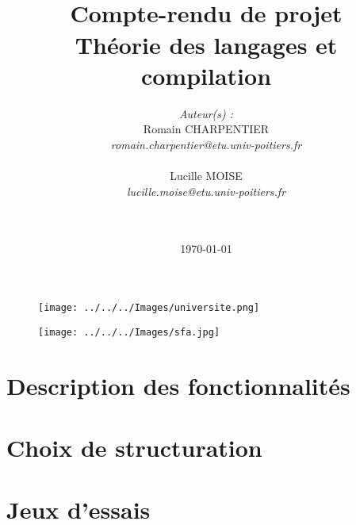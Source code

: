 \documentclass{report}
\title{
	\noindent\hrulefill\\
	\vspace{0.4\baselineskip}	%
	Compte-rendu de projet\\
	{\large Théorie des langages et compilation}\\
	\noindent\hrulefill
	\vspace{2\baselineskip}
}
\author{
	\textit{Auteur(s) :}\\
	Romain CHARPENTIER\\
	\textit{romain.charpentier@etu.univ-poitiers.fr}\\\\
	Lucille MOISE\\
	\textit{lucille.moise@etu.univ-poitiers.fr}\\\\\\
}
\date{\today}
\begin{document}
\lstset{language=C++}
	\begin{figure}
	\vspace{5\baselineskip}
   	 \begin{minipage}[c]{.3\linewidth}
   	     \centering
   	     \texttt{[image: ../../../Images/universite.png]} 
 	   \end{minipage}
  	  \hfill
  	  \begin{minipage}[c]{.3\linewidth}
   	     \centering
    	    \texttt{[image: ../../../Images/sfa.jpg]}
    	\end{minipage}
	\end{figure}
	\maketitle
	\newpage
	\section{Description des fonctionnalités}
	\section{Choix de structuration}
	\section{Jeux d'essais}
\end{document}
